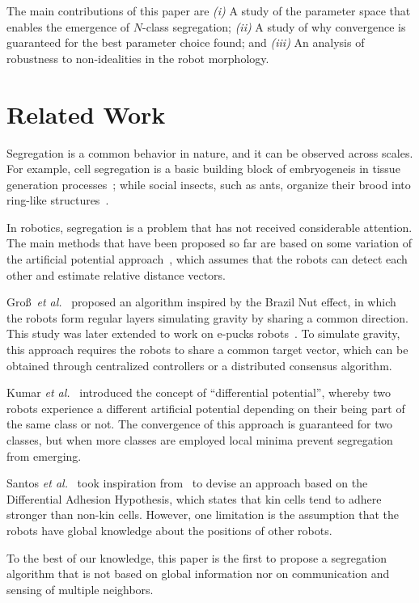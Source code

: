 \documentclass[letterpaper, 10 pt, conference]{ieeeconf}
\begin{document}
The main contributions of this paper are \emph{(i)} A study of the parameter
space that enables the emergence of $N$-class segregation; \emph{(ii)} A study
of why convergence is guaranteed for the best parameter choice found; and
\emph{(iii)} An analysis of robustness to non-idealities in the robot
morphology.

\section{Related Work}
Segregation is a common behavior in nature, and it can be observed across
scales. For example, cell segregation is a basic building block of embryogeneis
in tissue generation processes~\cite{batlle_molecular_2012,Steinberg1963}; while
social insects, such as ants, organize their brood into ring-like
structures~\cite{Franks1992}.

In robotics, segregation is a problem that has not received considerable
attention. The main methods that have been proposed so far are based on some
variation of the artificial potential approach~\cite{Spears2004}, which assumes
that the robots can detect each other and estimate relative distance vectors.

Gro\ss~\emph{et al.}~\cite{gross_segregation_2009} proposed an
algorithm inspired by the Brazil Nut effect, in which the robots form regular
layers simulating gravity by sharing a common direction. This study was later
extended to work on e-pucks robots~\cite{Chen2012}. To simulate gravity, this
approach requires the robots to share a common target vector, which can be
obtained through centralized controllers or a distributed consensus algorithm.

Kumar \emph{et al.}~\cite{kumar_segregation_2010} introduced the concept of
``differential potential'', whereby two robots experience a different artificial
potential depending on their being part of the same class or not. The
convergence of this approach is guaranteed for two classes, but when more
classes are employed local minima prevent segregation from emerging.

Santos \emph{et al.}~\cite{santos_segregation_2014} took inspiration
from~\cite{kumar_segregation_2010} to devise an approach based on the
Differential Adhesion Hypothesis, which states that kin cells tend to adhere
stronger than non-kin cells. However, one limitation is the assumption
that the robots have global knowledge about the positions of other robots.

To the best of our knowledge, this paper is the first to propose a segregation
algorithm that is not based on global information nor on communication and
sensing of multiple neighbors.
\end{document}

